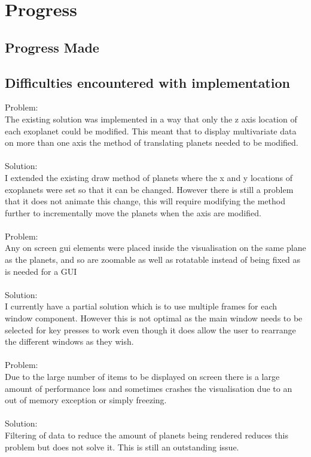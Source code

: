 \documentclass[11pt
              , a4paper
              , twoside
              , openright
              ]{report}
\begin{document}
\chapter{Progress}

\section{Progress Made}

\section{Difficulties encountered with implementation}
Problem:\\
The existing solution was implemented in a way that only the z axis location of each exoplanet could be modified. This meant that to display multivariate data on more than one axis the method of translating planets needed to be modified.
\\\\
Solution:\\
I extended the existing draw method of planets where the x and y locations of exoplanets were set so that it can be changed. However there is still a problem that it does not animate this change, this will require modifying the method further to incrementally move the planets when the axis are modified.
\\\\
Problem:\\
Any on screen gui elements were placed inside the visualisation on the same plane as the planets, and so are zoomable as well as rotatable instead of being fixed as is needed for a GUI
\\\\
Solution:\\
I currently have a partial solution which is to use multiple frames for each window component. However this is not optimal as the main window needs to be selected for key presses to work even though it does allow the user to rearrange the different windows as they wish. 
\\\\
Problem: \\
Due to the large number of items to be displayed on screen there is a large amount of performance loss and sometimes crashes the visualisation due to an out of memory exception or simply freezing.
\\\\
Solution:\\
Filtering of data to reduce the amount of planets being rendered reduces this problem but does not solve it. This is still an outstanding issue.
\end{document}
